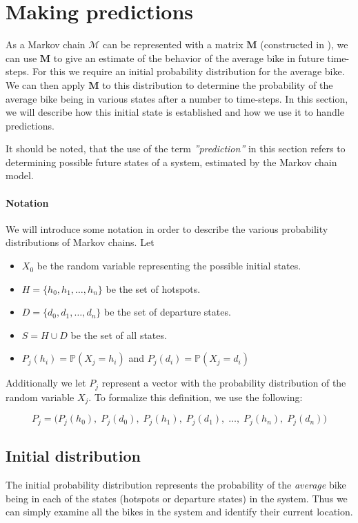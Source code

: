 \section{Making predictions}
As a Markov chain $\mathcal{M}$ can be represented with a matrix $\mathbf{M}$ (constructed in ), we can use $\mathbf{M}$ to give an estimate of the behavior of the average bike in future time-steps.
For this we require an initial probability distribution for the average bike.
We can then apply $\mathbf{M}$ to this distribution to determine the probability of the average bike being in various states after a number to time-steps.
In this section, we will describe how this initial state is established and how we use it to handle predictions.

It should be noted, that the use of the term \textit{''prediction''} in this section refers to determining possible future states of a system, estimated by the Markov chain model.

\paragraph{Notation}
We will introduce some notation in order to describe the various probability distributions of Markov chains.
Let
\begin{itemize}
\item $X_0$ be the random variable representing the possible initial states.
\item $H = \{h_0, h_1, \dots, h_n\}$ be the set of hotspots.
\item $D = \{d_0, d_1, \dots, d_n\}$ be the set of departure states.
\item $S = H \cup D$ be the set of all states.
\item $P_j(h_i) = \mathbb{P}(X_j = h_i)$ and $P_j(d_i) = \mathbb{P}(X_j = d_i)$
\end{itemize}

Additionally we let $P_j$ represent a vector with the probability distribution of the random variable $X_j$.
To formalize this definition, we use the following:

\begin{equation}\label{markov:vector}
P_j = \Big(
P_j(h_0),\;
P_j(d_0),\;
P_j(h_1),\;
P_j(d_1),\;
\dots,\;
P_j(h_n),\;
P_j(d_n)
\Big)
\end{equation}

\subsection{Initial distribution}
The initial probability distribution represents the probability of the \textit{average} bike being in each of the states (hotspots or departure states) in the system.
Thus we can simply examine all the bikes in the system and identify their current location.

